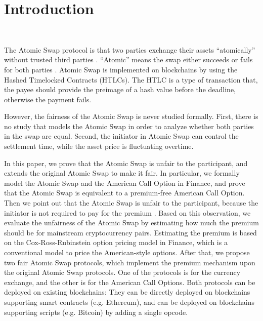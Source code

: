 \section{Introduction}
\label{sec:intro}

\\

The Atomic Swap protocol is that two parties exchange  their assets ``atomically'' without trusted third parties .
``Atomic'' means the swap either succeeds or fails for both parties .
Atomic Swap is implemented on blockchains by using the  Hashed Timelocked Contracts (HTLCs).
The HTLC is a type of transaction  that, the payee should provide the preimage of a hash value before the deadline, otherwise the payment fails.

However, the fairness of the Atomic Swap is never studied formally.
First, there is no study that models the Atomic Swap in order to analyze whether both parties in the swap are equal.
Second,  the initiator in Atomic Swap can control the settlement time, while the asset price is fluctuating overtime.

In this paper, we prove that the Atomic Swap is unfair to the participant, and extends the original Atomic Swap  to make it  fair.
In particular, we formally model the Atomic Swap and the American Call Option in Finance,
and prove that the Atomic Swap is equivalent to a premium-free American Call Option.
Then we point out that the Atomic Swap is unfair to the participant, because the initiator is not required to pay for the premium .
Based on this observation, we evaluate the unfairness of the Atomic Swap by estimating how much the premium should be for mainstream cryptocurrency pairs.
Estimating the premium is based on the Cox-Ross-Rubinstein option pricing model in Finance, which is a conventional model to price the American-style options.
After that, we propose two fair Atomic Swap protocols, which implement the premium mechanism upon the original Atomic Swap protocols.
One of the protocols is for the currency exchange, and the other is for the American Call Options.
Both protocols can be deployed on existing blockchains:
They can be directly deployed on blockchains supporting smart contracts (e.g. Ethereum),
and can be deployed on blockchains supporting scripts (e.g. Bitcoin) by adding a single opcode.

